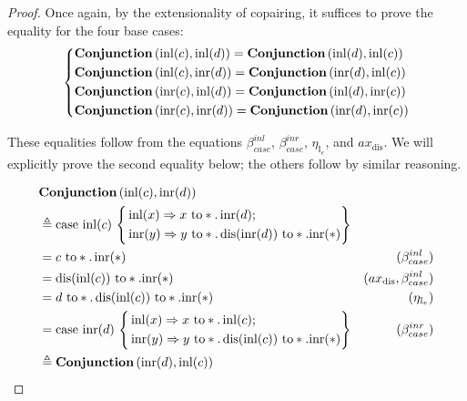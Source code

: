 \begin{proof}
 Once again, by the extensionality of copairing, it suffices to prove the equality for the four base cases:
 \[
      \left\{
      \begin{aligned}
      &   \textbf{Conjunction} \, (\mathrm{inl}(c), \mathrm{inl}(d)) =  \textbf{Conjunction} \, (\mathrm{inl}(d), \mathrm{inl}(c))  \\
      &  \textbf{Conjunction} \, (\mathrm{inl}(c), \mathrm{inr}(d)) =  \textbf{Conjunction} \, (\mathrm{inr}(d), \mathrm{inl}(c))  \\
      & \textbf{Conjunction} \, (\mathrm{inr}(c), \mathrm{inl}(d)) =  \textbf{Conjunction} \, (\mathrm{inl}(d), \mathrm{inr}(c))  \\
      &   \textbf{Conjunction} \, (\mathrm{inr}(c), \mathrm{inr}(d)) =  \textbf{Conjunction} \, (\mathrm{inr}(d), \mathrm{inr}(c))  
      \end{aligned}
      \right.
      \]

These equalities follow from the equations 
\(\beta_{case}^{inl}\), \(\beta_{case}^{inr}\), \(\eta_{\mathbb{I}_e}\), and \(ax_\text{dis}\). 
We will explicitly prove the second equality below; the others follow by similar reasoning.
  
  \begin{align*}
     &   \textbf{Conjunction} \, (\mathrm{inl}(c), \mathrm{inr}(d)) \\
     &  \triangleq \text{case } \mathrm{inl}(c)\,
  \left\{
    \begin{aligned}
    &\mathrm{inl}(x) \Rightarrow x \text{ to} *. \, \mathrm{inr}(d) ;\\
  \,& \mathrm{inr}(y) \Rightarrow y \text{ to} *. \,  \text{dis}(\mathrm{inr}(d)) \text{ to} *. \mathrm{inr}(*)
  \end{aligned} 
  \right\} \\
  & = c \text{  to} *. \, \mathrm{inr}(*) &  (\beta_{case}^{inl}) \\
  & =  \text{dis}(\mathrm{inl}(c)) \text{ to} *. \mathrm{inr}(*) & (ax_\text{dis}, \beta_{case}^{inl}) \\
  &= d \text{  to} *. \, \text{dis}(\mathrm{inl}(c)) \text{ to} *. \mathrm{inr}(*) & (\eta_{\mathbb{I}_e}) \\
  & = \text{case } \mathrm{inr}(d)\, \left\{ \begin{aligned}
    &\mathrm{inl}(x) \Rightarrow x \text{ to} *. \, \mathrm{inl}(c) ;\\
  \,& \mathrm{inr}(y) \Rightarrow y \text{ to} *. \,  \text{dis}(\mathrm{inl}(c)) \text{ to} *. \mathrm{inr}(*)
  \end{aligned} \right\} & (\beta_{case}^{inr}) \\
  & \triangleq \textbf{Conjunction} \, (\mathrm{inr}(d), \mathrm{inl}(c))
\end{align*}
\end{proof}

